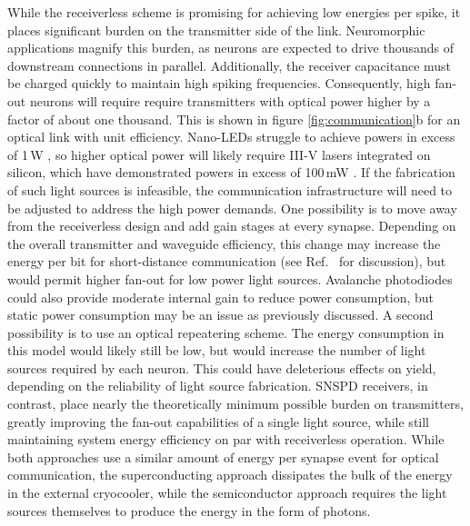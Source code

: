 \documentclass[twocolumn]{article}
\begin{document}
While the receiverless scheme is promising for achieving low energies per spike, it places significant burden on the transmitter side of the link. Neuromorphic applications magnify this burden, as neurons are expected to drive thousands of downstream connections in parallel. Additionally, the receiver capacitance must be charged quickly to maintain high spiking frequencies. Consequently, high fan-out neurons will require require transmitters with optical power higher by a factor of about one thousand. This is shown in figure \ref{fig:communication}b for an optical link with unit efficiency. Nano-LEDs struggle to achieve powers in excess of 1\,\textmu W \cite{romeira2019physical}, so higher optical power will likely require III-V lasers integrated on silicon, which have demonstrated powers in excess of 100\,mW \cite{zhou2015chip}. If the fabrication of such light sources is infeasible, the communication infrastructure will need to be adjusted to address the high power demands. One possibility is to move away from the receiverless design and add gain stages at every synapse. Depending on the overall transmitter and waveguide efficiency, this change may increase the energy per bit for short-distance communication (see Ref.\ \cite{miller2017attojoule} for discussion), but would permit higher fan-out for low power light sources. Avalanche photodiodes could also provide moderate internal gain to reduce power consumption, but static power consumption may be an issue as previously discussed. A second possibility is to use an optical repeatering scheme. The energy consumption in this model would likely still be low, but would increase the number of light sources required by each neuron. This could have deleterious effects on yield, depending on the reliability of light source fabrication. SNSPD receivers, in contrast, place nearly the theoretically minimum possible burden on transmitters, greatly improving the fan-out capabilities of a single light source, while still maintaining system energy efficiency on par with receiverless operation. While both approaches use a similar amount of energy per synapse event for optical communication, the superconducting approach dissipates the bulk of the energy in the external cryocooler, while the semiconductor approach requires the light sources themselves to produce the energy in the form of photons.
\end{document}
